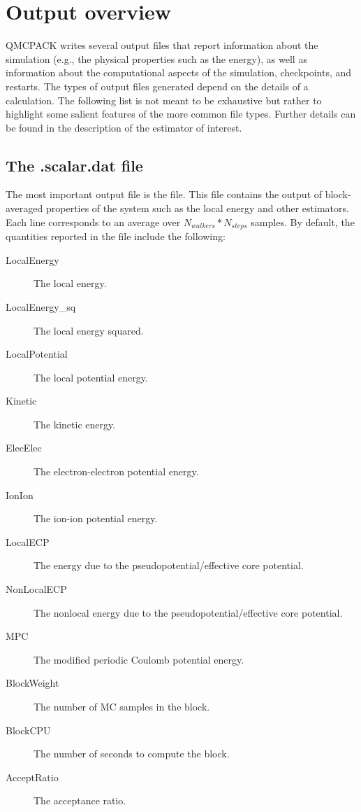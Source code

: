 \chapter{Output overview}
\label{chap:output_overview}

QMCPACK writes several output files that report information about the simulation (e.g., the physical properties such as the energy), as well as information about the computational aspects of the simulation, checkpoints, and restarts.
The types of output files generated depend on the details of a calculation. The following list is not meant to be exhaustive but rather to highlight some salient features of the more common file types. Further details can be found in the description of the estimator of interest.


\section{The .scalar.dat file}
\label{sec:scalardat_file}
The most important output file is the  file. This file contains the output of block-averaged properties of the system such as the local energy and other estimators.
Each line corresponds to an average over $N_{walkers}*N_{steps}$ samples.
By default, the quantities reported in the  file include the following:

\begin{description}
\item[LocalEnergy] The local energy.
\item[LocalEnergy\_sq] The local energy squared.
\item[LocalPotential] The local potential energy.
\item[Kinetic] The kinetic energy.
\item[ElecElec] The electron-electron potential energy.
\item[IonIon] The ion-ion potential energy.
\item[LocalECP] The energy due to the pseudopotential/effective core potential.
\item[NonLocalECP] The nonlocal energy due to the pseudopotential/effective core potential.
\item[MPC] The modified periodic Coulomb potential energy.
\item[BlockWeight] The number of MC samples in the block.
\item[BlockCPU] The number of seconds to compute the block.
\item[AcceptRatio] The acceptance ratio.
\end{description}

